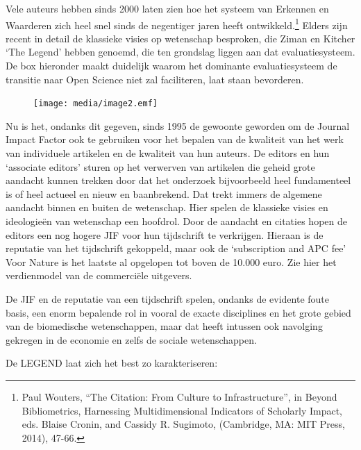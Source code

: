\documentclass{jote-book}
\begin{document}
	Vele auteurs hebben sinds 2000 laten zien hoe het systeem van Erkennen en Waarderen zich heel snel sinds de negentiger jaren heeft ontwikkeld.\footnote{Paul Wouters, “The Citation: From Culture to Infrastructure”, in Beyond Bibliometrics, Harnessing Multidimensional Indicators of Scholarly Impact, eds. Blaise Cronin, and Cassidy R. Sugimoto, (Cambridge, MA: MIT Press, 2014), 47-66. } Elders zijn recent in detail de klassieke visies op wetenschap besproken, die Ziman en Kitcher ‘The Legend' hebben genoemd, die ten grondslag liggen aan dat evaluatiesysteem. De box hieronder maakt duidelijk waarom het dominante evaluatiesysteem de transitie naar Open Science niet zal faciliteren, laat staan bevorderen.



	\begin{figure}
		\texttt{[image: media/image2.emf]}

		\caption{}

		\label{fig:rId17}


	\end{figure}



	Nu is het, ondanks dit gegeven, sinds 1995 de gewoonte geworden om de Journal Impact Factor ook te gebruiken voor het bepalen van de kwaliteit van het werk van individuele artikelen en de kwaliteit van hun auteurs. De editors en hun ‘associate editors' sturen op het verwerven van artikelen die geheid grote aandacht kunnen trekken door dat het onderzoek bijvoorbeeld heel fundamenteel is of heel actueel en nieuw en baanbrekend. Dat trekt immers de algemene aandacht binnen en buiten de wetenschap. Hier spelen de klassieke visies en ideologieën van wetenschap een hoofdrol. Door de aandacht en citaties hopen de editors een nog hogere JIF voor hun tijdschrift te verkrijgen. Hieraan is de reputatie van het tijdschrift gekoppeld, maar ook de ‘subscription and APC fee' Voor Nature is het laatste al opgelopen tot boven de 10.000 euro. Zie hier het verdienmodel van de commerciële uitgevers.



	De JIF en de reputatie van een tijdschrift spelen, ondanks de evidente foute basis, een enorm bepalende rol in vooral de exacte disciplines en het grote gebied van de biomedische wetenschappen, maar dat heeft intussen ook navolging gekregen in de economie en zelfs de sociale wetenschappen.



	De LEGEND laat zich het best zo karakteriseren:
\end{document}
